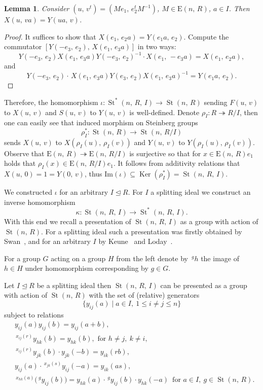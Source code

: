 \documentclass[11pt]{amsart}
\theoremstyle{plain} \declaretheorem[name=Theorem, Refname={Theorem,Theorems}]{tm} \Crefname{tm}{Theorem}{Theorems}
\numberwithin{equation}{section}
\newtheorem{lm}{Lemma} \numberwithin{lm}{section} \Crefname{lm}{Lemma}{Lemmas}
\theoremstyle{definition} \newtheorem{df}[lm]{Definition} \Crefname{df}{Definition}{Definitions}
\theoremstyle{remark} \newtheorem{rk}[lm]{Remark} \Crefname{rk}{Remark}{Remarks}
\newcommand{\Ker}{\mathop{\mathrm{Ker}}\nolimits}
\newcommand{\E}{{\mathrm{E}}}
\newcommand{\St}{\mathop{\mathrm{St}}\nolimits}
\newcommand{\epi}{\twoheadrightarrow}
\newcommand{\inv}{^{-1}}
\begin{document}
\begin{lm}
Consider $(u,\,v^t)=(Me_1,\,e_2^tM\inv)$, $M\in\E(n,\,R)$, $a\in I$. Then $X(u,\,va)=Y(ua,\,v)$.
\end{lm}

\begin{proof}
It suffices to show that $X(e_1,\,e_2a)=Y(e_1a,\,e_2)$. Compute the commutator $[Y(-e_3,\,e_2),\,X(e_1,\,e_3a)]$ in two ways:
$$
Y(-e_3,\,e_2)X(e_1,\,e_3a)Y(-e_3,\,e_2)\inv\cdot X(e_1,\,-e_3a)=X(e_1,\,e_2a),
$$
and
$$
Y(-e_3,\,e_2)\cdot\,X(e_1,\,e_3a)Y(e_3,\,e_2)X(e_1,\,e_3a)\inv=Y(e_1a,\,e_2).
$$
\end{proof}

Therefore, the homomorphism $\iota\colon\St^*(n,\,R,\,I)\rightarrow\St(n,\,R)$ sending $F(u,\,v)$ to $X(u,\,v)$ and $S(u,\,v)$ to $Y(u,\,v)$ is well-defined. Denote $\rho_I\colon R\epi R/I$, then one can easily see that induced morphism on Steinberg groups 
$$\rho_I^*\colon\St(n,\,R)\rightarrow\St(n,\,R/I)$$
 sends $X(u,\,v)$ to $X(\rho_I(u),\,\rho_I(v))$ and $Y(u,\,v)$ to $Y(\rho_I(u),\,\rho_I(v))$. Observe that $\E(n,\,R)\epi\E(n,\,R/I)$ is surjective so that for $x\in\E(n,\,R)e_1$ holds that $\rho_I(x)\in\E(n,\,R/I)e_1$. It follows from additivity relations that $X(u,\,0)=1=Y(0,\,v)$, thus $\mathrm{Im}(\iota)\subseteq\Ker(\rho_I^*)=\St(n,\,R,\,I)$.

We constructed $\iota$ for an arbitrary $I\trianglelefteq R$. For $I$ a splitting ideal we construct an inverse homomorphism
$$
\kappa\colon\St(n,\,R,\,I)\rightarrow\St^*(n,\,R,\,I).
$$
With this end we recall a presentation of $\St(n,\,R,\,I)$ as a group with action of $\St(n,\,R)$. For a splitting ideal such a presentation was firstly obtained by Swan~\cite{Swa1,Swa2,Swa3}, and for an arbitrary $I$ by Keune~\cite{Keu} and Loday~\cite{Lod}.

For a group $G$ acting on a group $H$ from the left denote by $\!\,^gh$ the image of $h\in H$ under homomorphism corresponding by $g\in G$.

Let $I\trianglelefteq R$ be a splitting ideal then $\St(n,\,R,\,I)$ can be presented as a group with action of $\St(n,\,R)$ with the set of (relative) generators
$$
\{y_{ij}(a)\mid a\in I,\ 1\leq i\neq j\leq n\}
$$
subject to relations
\setcounter{equation}{0}
\renewcommand{\theequation}{KL\arabic{equation}}
\begin{align}
&y_{ij}(a)y_{ij}(b)=y_{ij}(a+b),\\
&\!\,^{x_{ij}(r)}y_{hk}(b)=y_{hk}(b),\text{ for }h\neq j,\ k\neq i,\\
&\!\,^{x_{ij}(r)}y_{jk}(b)\cdot y_{jk}(-b)=y_{ik}(rb),\\
&y_{ij}(a)\cdot\,^{x_{jk}(s)}y_{ij}(-a)=y_{ik}(as),\\
&\!\,^{x_{hk}(a)}\big(\!\,^gy_{ij}(b)\big)=y_{hk}(a)\cdot\,^gy_{ij}(b)\cdot y_{hk}(-a)\,\text{ for }a\in I,\ g\in\St(n,\,R).
\end{align}
\end{document}

